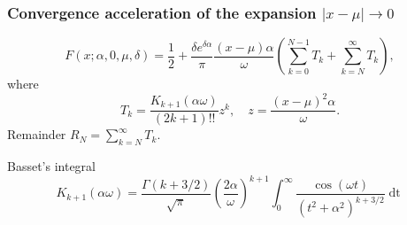 \documentclass[10pt,a4paper,oneside]{article}
\numberwithin{equation}{section}
\begin{document}
\begin{table}[H]
	\centering
	\caption{The remainder of the series expansion  \eqref{expansion_xmu_b0_positive} and bound \eqref{bound_remainder_xmu_b0_positive}, estimating $N$ using \eqref{N_expansion_xmu_b0_positive} to achieve machine precision.}
	\label{table_bound_remainder_xmu_b0_positive}
\end{table}

\subsubsection{Convergence acceleration of the expansion $|x-\mu| \to 0$}

\begin{equation}
F(x;\alpha, 0, \mu, \delta) = \frac{1}{2} + \frac{\delta e^{\delta \alpha}}{\pi} \frac{(x-\mu)\alpha}{\omega} \left(\sum_{k=0}^{N-1} T_k + \sum_{k=N}^{\infty} T_k\right),
\end{equation}
where
\begin{equation}
T_k = \frac{K_{k+1}(\alpha\omega)}{(2k + 1)!!} z^k, \quad z = \frac{(x-\mu)^2 \alpha}{\omega}.
\end{equation}
Remainder $R_N = \sum_{k=N}^{\infty} T_k$.

Basset's integral \cite[\S 10.32.11]{NIST:DLMF}
\begin{equation}
K_{k+1}(\alpha\omega) = \frac{\Gamma(k + 3/2)}{\sqrt{\pi}}\left(\frac{2\alpha}{\omega}\right)^{k+1} \int_0^{\infty} \frac{\cos(\omega t)}{(t^2 + \alpha^2)^{k + 3/2}} \mathop{dt}
\end{equation}
\end{document}
